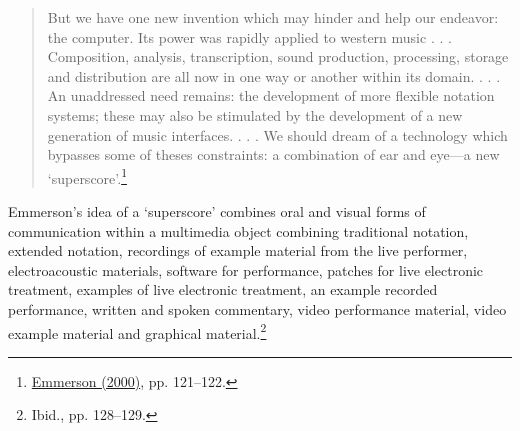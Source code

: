 \begin{quote}
But we have one new invention which may hinder and help our endeavor: the computer. Its power was rapidly applied to western music . . . Composition, analysis, transcription, sound production, processing, storage and distribution are all now in one way or another within its domain. . . . An unaddressed need remains: the development of more flexible notation systems; these may also be stimulated by the development of a new generation of music interfaces. . . . We should dream of a technology which bypasses some of theses constraints: a combination of ear and eye---a new `superscore'.\footnote{\hyperlink{emmersoncross}{Emmerson (2000)}, pp. 121--122.} 
\end{quote}
Emmerson's idea of a `superscore' combines oral and visual forms of communication within a multimedia object combining traditional notation, extended notation, recordings of example material from the live performer, electroacoustic materials, software for performance, patches for live electronic treatment, examples of live electronic treatment, an example recorded performance, written and spoken commentary, video performance material, video example material and graphical material.\footnote{Ibid., pp. 128--129.} 

